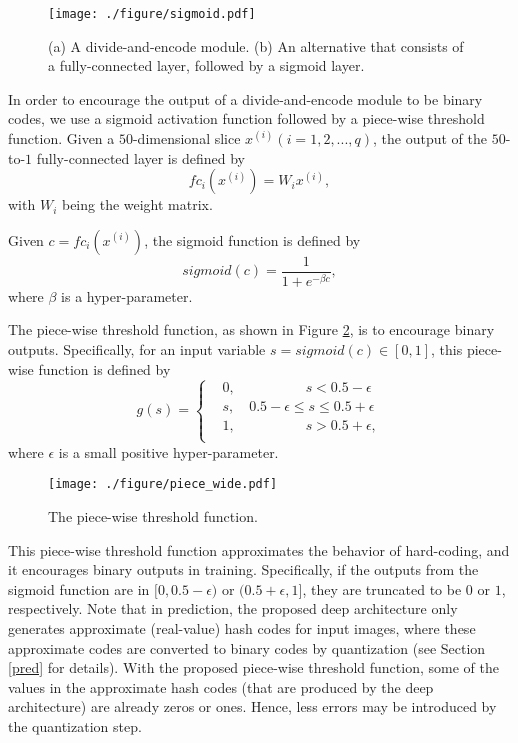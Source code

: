 \documentclass[10pt,twocolumn,letterpaper]{article}
\begin{document}
\begin{figure}
  \centering
  \texttt{[image: ./figure/sigmoid.pdf]}
  \caption{(a) A divide-and-encode module. (b) An alternative that consists of a fully-connected layer, followed by a sigmoid layer.}
    \label{DCM}
\end{figure}


In order to encourage the output of a divide-and-encode module to be binary codes, we use a sigmoid activation function followed by a piece-wise threshold function. Given a $50$-dimensional slice $x^{(i)}(i=1,2,...,q)$, the output of the $50$-to-$1$ fully-connected layer is defined by
\begin{equation}
fc_i(x^{(i)})=W_ix^{(i)},
\end{equation}
with $W_i$ being the weight matrix.

Given $c=fc_i(x^{(i)})$, the sigmoid function is defined by
\begin{equation}
sigmoid(c)=\frac{1}{1+e^{-\beta c}},
\end{equation}
where $\beta$ is a hyper-parameter.

The piece-wise threshold function, as shown in Figure \ref{piece-wise_fig}, is to encourage binary outputs. Specifically, for an input variable $s=sigmoid(c)\in [0,1]$, this piece-wise function is defined by
\begin{equation}
g(s)= \left\{
\begin{array}{rl}
&0,   \quad \quad \quad \quad \quad s<0.5-\epsilon \\
&s, \quad 0.5-\epsilon \le s \le 0.5+\epsilon  \\
&1,   \quad \quad \quad \quad \quad s>0.5+\epsilon,\\
\end{array}
\right.
\end{equation}
where $\epsilon$ is a small positive hyper-parameter.


\begin{figure}
  \centering
  \texttt{[image: ./figure/piece\_wide.pdf]}
  \caption{The piece-wise threshold function.}
    \label{piece-wise_fig}
\end{figure}


This piece-wise threshold function approximates the behavior of hard-coding, and it encourages binary outputs in training. Specifically, if the outputs from the sigmoid function are in $[0,0.5-\epsilon)$ or $(0.5+\epsilon,1]$, they are truncated to be $0$ or $1$, respectively. Note that in prediction, the proposed deep architecture only generates approximate (real-value) hash codes for input images, where these approximate codes are converted to binary codes by quantization (see Section \ref{pred} for details). With the proposed piece-wise threshold function, some of the values in the approximate hash codes (that are produced by the deep architecture) are already zeros or ones. Hence, less errors may be introduced by the quantization step.
\end{document}
